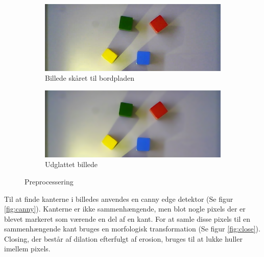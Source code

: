 \begin{figure}[H]
	\centering
	\begin{subfigure}{.45\textwidth}
		\centering
		\includegraphics[scale=0.3]{images/cropped}
		\caption{Billede skåret til bordpladen}
		\label{fig:cropped}
	\end{subfigure}
	\begin{subfigure}{.45\textwidth}
		\centering
		\includegraphics[scale=0.3]{images/smooth}
		\caption{Udglattet billede}
		\label{fig:smooth}
	\end{subfigure}
	\caption{Preprocessering}
	\label{fig:preprocessing}
\end{figure}


Til at finde kanterne i billedes anvendes en canny edge detektor (Se figur \ref{fig:canny}). Kanterne er ikke sammenhængende, men blot nogle pixels der er blevet markeret som værende en del af en kant. For at samle disse pixels til en sammenhængende kant bruges en morfologisk transformation (Se figur \ref{fig:close}). Closing, der består af dilation efterfulgt af erosion, bruges til at lukke huller imellem pixels. \\

